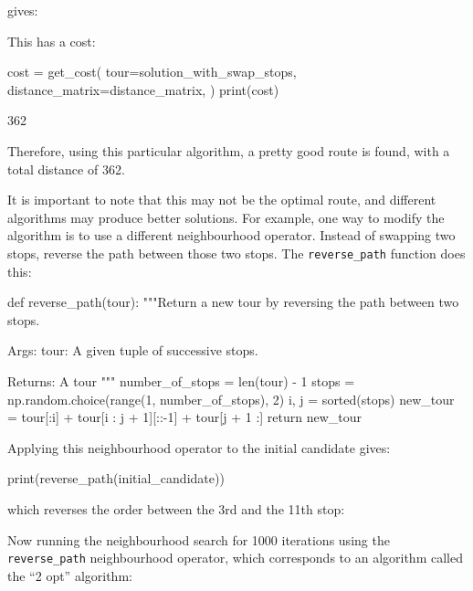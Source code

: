 gives:

\begin{pyout}
[0, 7, 2, 8, 5, 3, 1, 9, 12, 11, 4, 10, 6, 0]
\end{pyout}

This has a cost:

\begin{pyin}
cost = get_cost(
    tour=solution_with_swap_stops,
    distance_matrix=distance_matrix,
)
print(cost)
\end{pyin}

\begin{pyout}
362
\end{pyout}

Therefore, using this particular algorithm, a pretty good route is found, with a
total distance of 362.

It is important to note that this may not be the optimal route, and different algorithms
may produce better solutions.
For example, one way to modify the algorithm is to use a different neighbourhood operator.
Instead of swapping two stops, reverse the path between those two
stops. The \texttt{reverse_path} function does this:

\begin{pyin}
def reverse_path(tour):
    """Return a new tour by reversing the path between two
    stops.

    Args:
        tour: A given tuple of successive stops.

    Returns:
        A tour
    """
    number_of_stops = len(tour) - 1
    stops = np.random.choice(range(1, number_of_stops), 2)
    i, j = sorted(stops)
    new_tour = tour[:i] + tour[i : j + 1][::-1] + tour[j + 1 :]
    return new_tour
\end{pyin}

Applying this neighbourhood operator to the initial candidate gives:

\begin{pyin}
print(reverse_path(initial_candidate))
\end{pyin}

which reverses the order between the 3rd and the 11th stop:

\begin{pyout}
[0, 7, 4, 10, 8, 2, 9, 3, 11, 5, 12, 1, 6, 0]
\end{pyout}

Now running the neighbourhood search for 1000 iterations using the
\texttt{reverse_path} neighbourhood operator, which corresponds to
an algorithm called the ``2 opt'' algorithm: %

